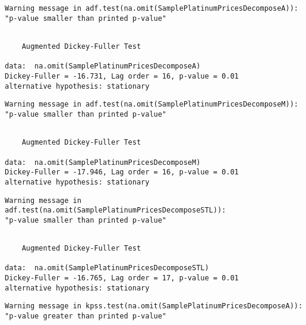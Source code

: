 \documentclass[11pt]{article}
\begin{document}
    \begin{Verbatim}[commandchars=\\\{\}]
Warning message in adf.test(na.omit(SamplePlatinumPricesDecomposeA)):
"p-value smaller than printed p-value"
    \end{Verbatim}

    
    \begin{verbatim}

	Augmented Dickey-Fuller Test

data:  na.omit(SamplePlatinumPricesDecomposeA)
Dickey-Fuller = -16.731, Lag order = 16, p-value = 0.01
alternative hypothesis: stationary

    \end{verbatim}

    
    \begin{Verbatim}[commandchars=\\\{\}]
Warning message in adf.test(na.omit(SamplePlatinumPricesDecomposeM)):
"p-value smaller than printed p-value"
    \end{Verbatim}

    
    \begin{verbatim}

	Augmented Dickey-Fuller Test

data:  na.omit(SamplePlatinumPricesDecomposeM)
Dickey-Fuller = -17.946, Lag order = 16, p-value = 0.01
alternative hypothesis: stationary

    \end{verbatim}

    
    \begin{Verbatim}[commandchars=\\\{\}]
Warning message in adf.test(na.omit(SamplePlatinumPricesDecomposeSTL)):
"p-value smaller than printed p-value"
    \end{Verbatim}

    
    \begin{verbatim}

	Augmented Dickey-Fuller Test

data:  na.omit(SamplePlatinumPricesDecomposeSTL)
Dickey-Fuller = -16.765, Lag order = 17, p-value = 0.01
alternative hypothesis: stationary

    \end{verbatim}

    
    \begin{Verbatim}[commandchars=\\\{\}]
Warning message in kpss.test(na.omit(SamplePlatinumPricesDecomposeA)):
"p-value greater than printed p-value"
    \end{Verbatim}
\end{document}
